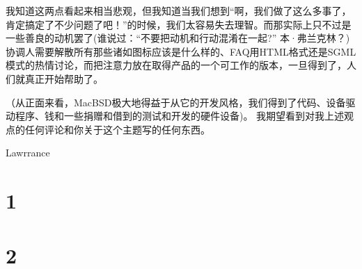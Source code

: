 \documentclass[a4paper,12pt,UTF8,twoside]{ctexbook}
\begin{document}
我知道这两点看起来相当悲观，但我知道当我们想到“啊，我们做了这么多事了，肯定搞定了不少问题了吧！”的时候，我们太容易失去理智。而那实际上只不过是一些善良的动机罢了(谁说过：“不要把动机和行动混淆在一起?” 本·弗兰克林？)协调人需要解散所有那些诸如图标应该是什么样的、FAQ用HTML格式还是SGML模式的热情讨论，而把注意力放在取得产品的一个可工作的版本，一旦得到了，人们就真正开始帮助了。

（从正面来看，MacBSD极大地得益于从它的开发风格，我们得到了代码、设备驱动程序、钱和一些捐赠和借到的测试和开发的硬件设备)。
我期望看到对我上述观点的任何评论和你关于这个主题写的任何东西。


Lawrrance



\section{1}
\section{2}

\backmatter
\end{document}
